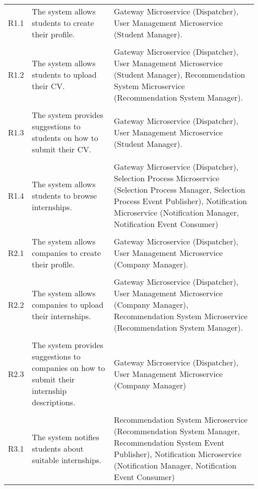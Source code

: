 \begin{longtable}{p{}p{}p{}}
    R1.1 &
    The system allows students to create their profile. &
    Gateway Microservice (Dispatcher), User Management Microservice (Student Manager). \\
    \vspace{0.5em}\\
    R1.2 &
    The system allows students to upload their CV. &
    Gateway Microservice (Dispatcher), User Management Microservice (Student Manager), Recommendation System Microservice (Recommendation System Manager). \\
    \vspace{0.5em}\\
    R1.3 &
    The system provides suggestions to students on how to submit their CV. &
    Gateway Microservice (Dispatcher), User Management Microservice (Student Manager). \\
    \vspace{0.5em}\\
    R1.4 &
    The system allows students to browse internships. &
    Gateway Microservice (Dispatcher), Selection Process Microservice (Selection Process Manager, Selection Process Event Publisher), Notification Microservice (Notification Manager, Notification Event Consumer) \\
    \vspace{0.5em}\\
    R2.1 &
    The system allows companies to create their profile. &
    Gateway Microservice (Dispatcher), User Management Microservice (Company Manager). \\
    \vspace{0.5em}\\
    R2.2 &
    The system allows companies to upload their internships. &
    Gateway Microservice (Dispatcher), User Management Microservice (Company Manager), Recommendation System Microservice (Recommendation System Manager). \\
    \vspace{0.5em}\\
    R2.3 &
    The system provides suggestions to companies on how to submit their internship descriptions. &
    Gateway Microservice (Dispatcher), User Management Microservice (Company Manager) \\
    \vspace{0.5em}\\
    R3.1 &
    The system notifies students about suitable internships. &
    Recommendation System Microservice (Recommendation System Manager, Recommendation System Event Publisher), Notification Microservice (Notification Manager, Notification Event Consumer) \\

\end{longtable}
